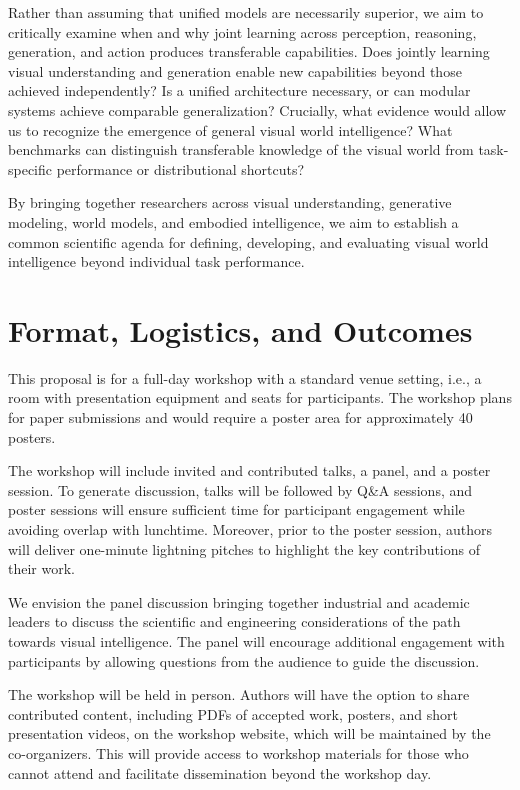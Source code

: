 \documentclass[11pt]{article}
\begin{document}
Rather than assuming that unified models are necessarily superior, we aim to critically examine when and why joint learning across perception, reasoning, generation, and action produces transferable capabilities. Does jointly learning visual understanding and generation enable new capabilities beyond those achieved independently? Is a unified architecture necessary, or can modular systems achieve comparable generalization? Crucially, what evidence would allow us to recognize the emergence of general visual world intelligence? What benchmarks can distinguish transferable knowledge of the visual world from task-specific performance or distributional shortcuts?


By bringing together researchers across visual understanding, generative modeling, world models, and embodied intelligence, we aim to establish a common scientific agenda for defining, developing, and evaluating visual world intelligence beyond individual task performance.


\section{Format, Logistics, and Outcomes}

This proposal is for a full-day workshop with a standard venue setting, i.e., a room with presentation equipment and seats for participants. The workshop plans for paper submissions and would require a poster area for approximately 40 posters.


The workshop will include invited and contributed talks, a panel, and a poster session. To generate discussion, talks will be followed by Q\&A sessions, and poster sessions will ensure sufficient time for participant engagement while avoiding overlap with lunchtime. Moreover, prior to the poster session, authors will deliver one-minute lightning pitches to highlight the key contributions of their work.


We envision the panel discussion bringing together industrial and academic leaders to discuss the scientific and engineering considerations of the path towards visual intelligence. The panel will encourage additional engagement with participants by allowing questions from the audience to guide the discussion.


The workshop will be held in person. Authors will have the option to share contributed content, including PDFs of accepted work, posters, and short presentation videos, on the workshop website, which will be maintained by the co-organizers. This will provide access to workshop materials for those who cannot attend and facilitate dissemination beyond the workshop day.
\end{document}
